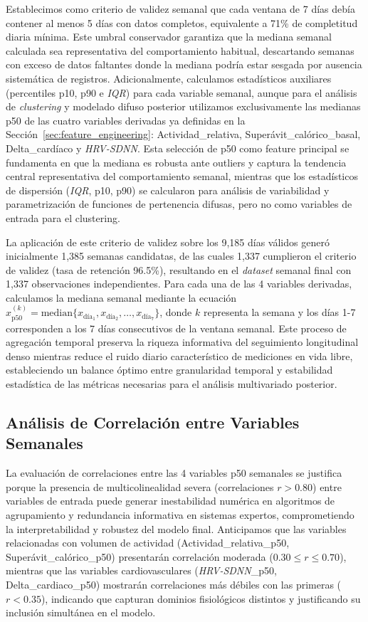 Establecimos como criterio de validez semanal que cada ventana de 7 días debía contener al menos 5 días con datos completos, equivalente a 71\% de completitud diaria mínima. Este umbral conservador garantiza que la mediana semanal calculada sea representativa del comportamiento habitual, descartando semanas con exceso de datos faltantes donde la mediana podría estar sesgada por ausencia sistemática de registros. Adicionalmente, calculamos estadísticos auxiliares (percentiles p10, p90 e \textit{IQR}) para cada variable semanal, aunque para el análisis de \textit{clustering} y modelado difuso posterior utilizamos exclusivamente las medianas p50 de las cuatro variables derivadas ya definidas en la Sección~\ref{sec:feature_engineering}: Actividad\_relativa, Superávit\_calórico\_basal, Delta\_cardíaco y \textit{HRV-SDNN}. Esta selección de p50 como feature principal se fundamenta en que la mediana es robusta ante outliers y captura la tendencia central representativa del comportamiento semanal, mientras que los estadísticos de dispersión (\textit{IQR}, p10, p90) se calcularon para análisis de variabilidad y parametrización de funciones de pertenencia difusas, pero no como variables de entrada para el clustering.

La aplicación de este criterio de validez sobre los 9,185 días válidos generó inicialmente 1,385 semanas candidatas, de las cuales 1,337 cumplieron el criterio de validez (tasa de retención 96.5\%), resultando en el \textit{dataset} semanal final con 1,337 observaciones independientes. Para cada una de las 4 variables derivadas, calculamos la mediana semanal mediante la ecuación $x^{(k)}_{\text{p50}} = \text{median}\{x_{\text{día}_1}, x_{\text{día}_2}, \ldots, x_{\text{día}_7}\}$, donde $k$ representa la semana y los días 1-7 corresponden a los 7 días consecutivos de la ventana semanal. Este proceso de agregación temporal preserva la riqueza informativa del seguimiento longitudinal denso mientras reduce el ruido diario característico de mediciones en vida libre, estableciendo un balance óptimo entre granularidad temporal y estabilidad estadística de las métricas necesarias para el análisis multivariado posterior.

\subsection{Análisis de Correlación entre Variables Semanales}
\label{subsec:correlacion_semanal}

La evaluación de correlaciones entre las 4 variables p50 semanales se justifica porque la presencia de multicolinealidad severa (correlaciones $r > 0.80$) entre variables de entrada puede generar inestabilidad numérica en algoritmos de agrupamiento y redundancia informativa en sistemas expertos, comprometiendo la interpretabilidad y robustez del modelo final. Anticipamos que las variables relacionadas con volumen de actividad (Actividad\_relativa\_p50, Superávit\_calórico\_p50) presentarán correlación moderada ($0.30 \leq r \leq 0.70$), mientras que las variables cardiovasculares (\textit{HRV-SDNN}\_p50, Delta\_cardiaco\_p50) mostrarán correlaciones más débiles con las primeras ($r < 0.35$), indicando que capturan dominios fisiológicos distintos y justificando su inclusión simultánea en el modelo.

